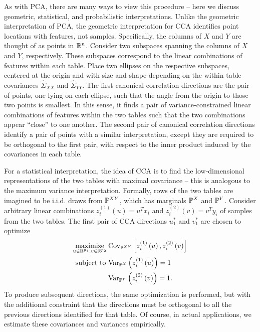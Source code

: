 \documentclass{article}
\begin{document}
As with PCA, there are many ways to view this procedure -- here we discuss
geometric, statistical, and probabilistic interpretations. Unlike the geometric
interpretation of PCA, the geometric interpretation for CCA identifies point
locations with features, not samples. Specifically, the columns of $X$ and $Y$
are thought of as points in $\reals^{n}$. Consider two subspaces
spanning the columns of $X$ and $Y$, respectively. These subspaces correspond to
the linear combinations of features within each table. Place two ellipses on the
respective subspaces, centered at the origin and with size and shape depending
on the within table covariances $\hat{\Sigma}_{XX}$ and $\hat{\Sigma}_{YY}$. The
first canonical correlation directions are the pair of points, one lying on each
ellipse, such that the angle from the origin to those two points is smallest. In
this sense, it finds a pair of variance-constrained linear combinations of
features within the two tables such that the two combinations appear ``close'' to
one another. The second pair of canonical correlation directions identify a pair
of points with a similar interpretation, except they are required to be orthogonal
to the first pair, with respect to the inner product induced by the covariances
in each table.

For a statistical interpretation, the idea of CCA is to find the low-dimensional
representations of the two tables with maximal covariance -- this is analogous
to the maximum variance interpretation. Formally, rows of the two tables are
imagined to be i.i.d. draws from $\P^{XY}$, which has marginals $\P^{X}$ and
$\P^{Y}$. Consider arbitrary linear combinations $z_{i}^{(1)}\left(u\right) =
u^{T} x_{i}$ and $z_{i}^{(2)}\left(v\right) = v^{T}y_{i}$ of samples from the
two tables. The first pair of CCA directions $u_{1}^{\ast}$ and $v_{1}^{\ast}$
are chosen to optimize
\begin{align}
  \maximize_{u \in \reals^{p_{1}}, v \in \reals^{p_{2}}}\medspace
  &\Covsubarg{\P^{XY}}{z_{i}^{(1)}\left(u\right),
    z_{i}^{(2)}\left(v\right)} \label{eq:cancor_optim} \\
\text{subject to } &\Varsubarg{\P^{X}}{z_{i}^{(1)}\left(u\right)} = 1 \nonumber \\
&\Varsubarg{\P^{Y}}{z_{i}^{(2)}\left(v\right)} = 1. \nonumber
\end{align}
To produce subsequent directions, the same optimization is performed, but with
the additional constraint that the directions must be orthogonal to all the
previous directions identified for that table. Of course, in actual
applications, we estimate these covariances and variances empirically.
\end{document}
